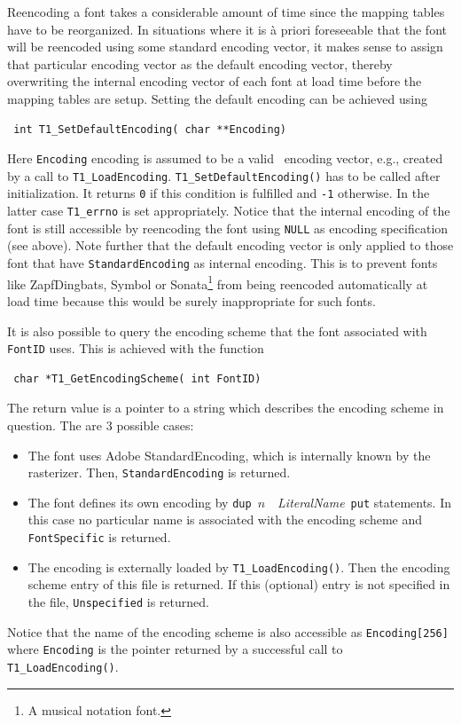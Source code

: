 Reencoding a font takes a considerable amount of time since the mapping tables
have to be reorganized. In situations where it is \`a priori foreseeable that the
font will be reencoded using some standard encoding vector, it makes sense to
assign that particular encoding vector as the default encoding vector,
thereby overwriting the internal encoding vector of each font at load time
before the mapping tables are setup. Setting the default encoding can be
achieved using 
\precorr
\begin{verbatim}
 int T1_SetDefaultEncoding( char **Encoding)
\end{verbatim}\postcorr
Here \verb+Encoding+ encoding is assumed to be a valid \tonelib\ encoding
vector, e.g., created by a call to \verb+T1_LoadEncoding+.
\verb+T1_SetDefaultEncoding()+ has to be called after initialization. It
returns \verb+0+ if this condition is fulfilled and \verb+-1+
otherwise. In the latter case \verb+T1_errno+ is set appropriately. 
Notice that the internal encoding of the font is still accessible by
reencoding the font using \verb+NULL+ as encoding specification (see above). 
Note further that the default encoding vector is only applied to those font
that have \verb+StandardEncoding+ as internal encoding. This is to prevent
fonts like ZapfDingbats, Symbol or Sonata\footnote{A musical notation font.}
from being reencoded automatically at load time because this would be
surely inappropriate for such fonts.

It is also possible to query the encoding scheme that the font associated with
\verb+FontID+ uses. This is achieved with the function
\precorr
\begin{verbatim}
 char *T1_GetEncodingScheme( int FontID)
\end{verbatim}\postcorr
The return value is a pointer to a string which describes the encoding scheme
in question. The are 3 possible cases:
\begin{itemize}
\item The font uses Adobe StandardEncoding, which is internally known by the
  rasterizer. Then, \verb+StandardEncoding+ is returned.
\item The font defines its own encoding by \hbox{\verb+dup+ $n$ {\em
      LiteralName} \verb+put+} statements. In this case no particular name is
  associated with the encoding scheme and \verb+FontSpecific+ is returned.
\item The encoding is externally loaded by \verb+T1_LoadEncoding()+. Then the
  encoding scheme entry of this file is returned. If this (optional) entry is
  not specified in the file, \verb+Unspecified+ is returned.
\end{itemize}
Notice that the name of the encoding scheme is also accessible as
\verb+Encoding[256]+ where \verb+Encoding+ is the pointer returned by a
successful call to \verb+T1_LoadEncoding()+.


